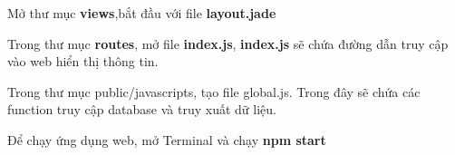 Mở thư mục \textbf{views},bắt đầu với file \textbf{layout.jade}


Trong thư mục \textbf{routes}, mở file \textbf{index.js}, \textbf{index.js} sẽ chứa đường dẫn truy cập vào web hiển thị thông tin.


Trong thư mục public/javascripts, tạo file global.js. Trong đây sẽ chứa các function truy cập database và truy xuất dữ liệu.


Để chạy ứng dụng web, mở Terminal và chạy \textbf{npm start}
\label{ref{fig4_10}}



